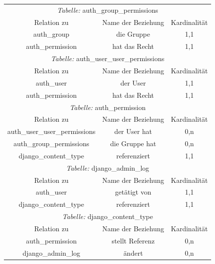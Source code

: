 \begin{longtable}{@{}ccc@{}}
  \toprule
  \multicolumn{3}{c}{\emph{Tabelle:} auth\_group\_permissions} \\
  Relation zu & Name der Beziehung & Kardinalität \\
  \cmidrule(lr){1-1}\cmidrule(lr){2-2}\cmidrule(lr){3-3}
  auth\_group & die Gruppe & 1,1 \\
  auth\_permission & hat das Recht & 1,1 \\

  \toprule
  \multicolumn{3}{c}{\emph{Tabelle:} auth\_user\_user\_permissions} \\
  Relation zu & Name der Beziehung & Kardinalität \\
  \cmidrule(lr){1-1}\cmidrule(lr){2-2}\cmidrule(lr){3-3}
  auth\_user & der User & 1,1 \\
  auth\_permission & hat das Recht & 1,1 \\

  \toprule
  \multicolumn{3}{c}{\emph{Tabelle:} auth\_permission} \\
  Relation zu & Name der Beziehung & Kardinalität \\
  \cmidrule(lr){1-1}\cmidrule(lr){2-2}\cmidrule(lr){3-3}
  auth\_user\_user\_permissions & der User hat  & 0,n \\
  auth\_group\_permissions & die Gruppe hat & 0,n \\
  django\_content\_type & referenziert & 1,1 \\

  \toprule
  \multicolumn{3}{c}{\emph{Tabelle:} django\_admin\_log} \\
  Relation zu & Name der Beziehung & Kardinalität \\
  \cmidrule(lr){1-1}\cmidrule(lr){2-2}\cmidrule(lr){3-3}
  auth\_user & getätigt von  & 1,1 \\
  django\_content\_type & referenziert & 1,1 \\

  \toprule
  \multicolumn{3}{c}{\emph{Tabelle:} django\_content\_type} \\
  Relation zu & Name der Beziehung & Kardinalität \\
  \cmidrule(lr){1-1}\cmidrule(lr){2-2}\cmidrule(lr){3-3}
  auth\_permission & stellt Referenz  & 0,n \\
  django\_admin\_log & ändert & 0,n \\
\end{longtable}
